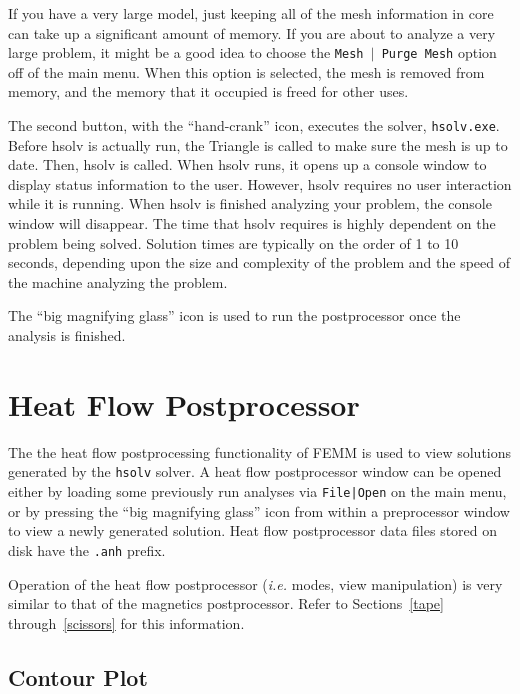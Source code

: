 If you have a very large model, just keeping all of the mesh
information in core can take up a significant amount of memory. If
you are about to analyze a very large problem, it might be a good
idea to choose the \texttt{Mesh $\vert $ Purge Mesh} option off of
the main menu. When this option is selected, the mesh is removed
from memory, and the memory that it occupied is freed for other
uses.

The second button, with the ``hand-crank'' icon, executes the solver,
\texttt{hsolv.exe}. Before hsolv is actually run, the Triangle is
called to make sure the mesh is up to date. Then, hsolv is called. When
hsolv runs, it opens up a console window to display status information
to the user. However, hsolv requires no user interaction while it is
running. When hsolv is finished analyzing your problem, the console
window will disappear. The time that hsolv requires is highly dependent
on the problem being solved. Solution times are typically on the order of 1
to 10 seconds, depending upon the size and complexity of the problem and the
speed of the machine analyzing the problem.

The ``big magnifying glass'' icon is used to run the postprocessor once the
analysis is finished.



\section{Heat Flow Postprocessor}

The the heat flow postprocessing functionality of FEMM is
used to view solutions generated by the {\tt hsolv} solver.  A heat flow
postprocessor window can be opened either by loading
some previously run analyses via {\tt File|Open} on the main menu,
or by pressing the ``big magnifying glass'' icon from within a
preprocessor window to view a newly generated solution.
Heat flow postprocessor data files stored on disk have the
{\tt .anh} prefix.

Operation of the heat flow postprocessor ({\em i.e.} modes, view manipulation) is
very similar to that of the magnetics postprocessor.  Refer to
Sections~\ref{tape} through~\ref{scissors} for this information.

\subsection{Contour Plot}

